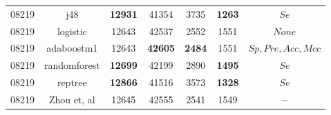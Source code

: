 \begin{table}[h]
\begin{center}
\begin{threeparttable}
\begin{tabular}{c c c c c c c}
    \hline
    08219 & j48 & \textbf{12931} & 41354 & 3735 & \textbf{1263} & $Se$ \\
    08219 & logistic & 12643 & 42537 & 2552 & 1551 & $None$ \\
    08219 & adaboostm1 & 12643 & \textbf{42605} & \textbf{2484} & 1551 & $Sp, Pre, Acc, Mcc$ \\
    08219 & randomforest & \textbf{12699} & 42199 & 2890 & \textbf{1495} & $Se$ \\
    08219 & reptree & \textbf{12866} & 41516 & 3573 & \textbf{1328} & $Se$ \\
    08219 & Zhou et, al & 12645 & 42555 & 2541 & 1549 & $-$ \\
  \bottomrule
\end{tabular}
\end{threeparttable}
\end{center}
\end{table}